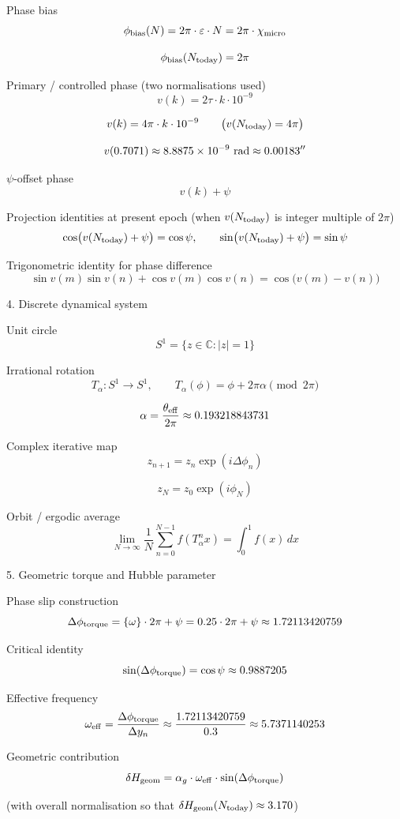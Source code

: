 Phase bias  
\[
\phi_{\rm bias}(N)=2\pi\cdot\varepsilon\cdot N=2\pi\cdot\chi_{\rm micro}
\]

\[
\phi_{\rm bias}(N_{\rm today})=2\pi
\]

Primary / controlled phase (two normalisations used)  
\[
v(k)=2\tau\cdot k\cdot 10^{-9}
\]

\[
v(k)=4\pi\cdot k\cdot 10^{-9}\qquad\bigl(v(N_{\rm today})=4\pi\bigr)
\]

\[
v(0.7071)\approx 8.8875\times 10^{-9}\ {\rm rad}\approx 0.00183''
\]

\(\psi\)-offset phase  
\[
v(k)+\psi
\]

Projection identities at present epoch (when \(v(N_{\rm today})\) is integer multiple of \(2\pi\))  
\[
\cos\bigl(v(N_{\rm today})+\psi\bigr)=\cos\psi,\qquad
\sin\bigl(v(N_{\rm today})+\psi\bigr)=\sin\psi
\]

Trigonometric identity for phase difference  
\[
\sin v(m)\sin v(n)+\cos v(m)\cos v(n)=\cos\bigl(v(m)-v(n)\bigr)
\]

4. Discrete dynamical system

Unit circle  
\[
S^{1}=\{z\in\mathbb{C}:|z|=1\}
\]

Irrational rotation  
\[
T_{\alpha}:S^{1}\to S^{1},\qquad T_{\alpha}(\phi)=\phi+2\pi\alpha\pmod{2\pi}
\]

\[
\alpha=\frac{\theta_{\rm eff}}{2\pi}\approx 0.193218843731
\]

Complex iterative map  
\[
z_{n+1}=z_{n}\exp(i\Delta\phi_{n})
\]

\[
z_{N}=z_{0}\exp(i\phi_{N})
\]

Orbit / ergodic average  
\[
\lim_{N\to\infty}\frac{1}{N}\sum_{n=0}^{N-1}f(T_{\alpha}^{n}x)=\int_{0}^{1}f(x)\,dx
\]

5. Geometric torque and Hubble parameter

Phase slip construction  
\[
\Delta\phi_{\rm torque}=\{\omega\}\cdot 2\pi+\psi=0.25\cdot 2\pi+\psi\approx 1.72113420759
\]

Critical identity  
\[
\sin(\Delta\phi_{\rm torque})=\cos\psi\approx 0.9887205
\]

Effective frequency  
\[
\omega_{\rm eff}=\frac{\Delta\phi_{\rm torque}}{\Delta y_{n}}\approx\frac{1.72113420759}{0.3}\approx 5.7371140253
\]

Geometric contribution  
\[
\delta H_{\rm geom}=\alpha_{g}\cdot\omega_{\rm eff}\cdot\sin(\Delta\phi_{\rm torque})
\]

(with overall normalisation so that \(\delta H_{\rm geom}(N_{\rm today})\approx 3.170\))

